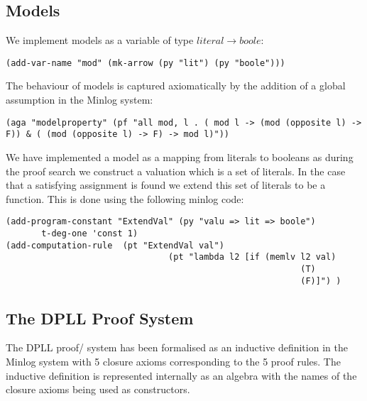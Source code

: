 \subsection*{Models}
We implement models as a variable of type $literal \to boole$:
\begin{center}
\texttt{(add-var-name "mod" (mk-arrow (py "lit") (py "boole")))}
\end{center}
The behaviour of models is captured axiomatically by the addition of a global assumption in the Minlog system:
\begin{center}
\texttt{(aga "modelproperty" (pf "all mod, l . ( mod l  -> (mod (opposite l) -> F)) \& ( (mod (opposite l) -> F) -> mod l)"))}
\end{center}
We have implemented a model as a mapping from literals to booleans as during the proof search we construct a valuation which is a set of literals. In the case that a satisfying assignment is found we extend this set of literals to be a function. This is done using the following minlog code:

\begin{lstlisting}[caption = "The ExtendVal function in Minlog"]
(add-program-constant "ExtendVal" (py "valu => lit => boole") 
       t-deg-one 'const 1)
(add-computation-rule  (pt "ExtendVal val")  
                                (pt "lambda l2 [if (memlv l2 val)                                                                                                       
                                                          (T)                                                                                                                        
                                                          (F)]") )
\end{lstlisting}






\subsection*{The DPLL Proof System}
The DPLL proof/ system has been formalised as an inductive definition in the Minlog system with 5 closure axioms corresponding to the 5 proof rules. The inductive definition is represented internally as an algebra with the names of the closure axioms being used as constructors.

